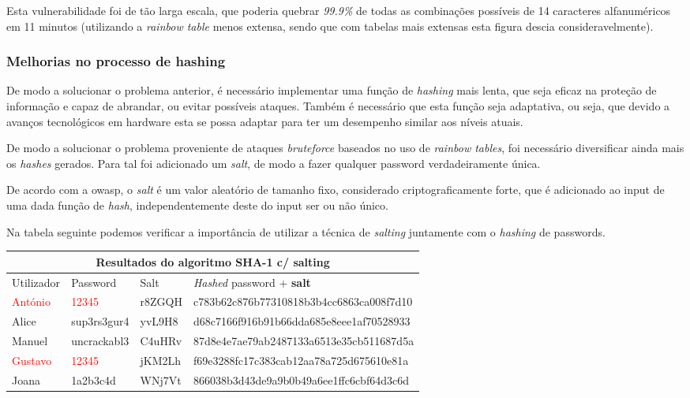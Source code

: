 Esta vulnerabilidade foi de tão larga escala, que poderia quebrar \emph{99.9\%} de todas as combinações possíveis de 14 caracteres alfanuméricos em 11 minutos (utilizando a \emph{rainbow table} menos extensa, sendo que com tabelas mais extensas esta figura descia consideravelmente).


\subsubsection{Melhorias no processo de hashing}

De modo a solucionar o problema anterior, é necessário implementar uma função de \emph{hashing} mais lenta, que seja eficaz na proteção de informação e capaz de abrandar, ou evitar possíveis ataques. Também é necessário que esta função seja adaptativa, ou seja, que devido a avanços tecnológicos em hardware esta se possa adaptar para ter um desempenho similar aos níveis atuais.

De modo a solucionar o problema proveniente de ataques \emph{bruteforce} baseados no uso de \emph{rainbow tables}, foi necessário diversificar ainda mais os \emph{hashes} gerados. Para tal foi adicionado um \emph{salt}\cite{sriramya2015providing}, de modo a fazer qualquer password verdadeiramente única.

De acordo com a \gls{owasp}, o \emph{salt} é um valor aleatório de tamanho fixo, considerado criptograficamente forte, que é adicionado ao input de uma dada função de \emph{hash}, independentemente deste do input ser ou não único.

Na tabela seguinte podemos verificar a importância de utilizar a técnica de \emph{salting} juntamente com o \emph{hashing} de passwords.

\begin{center}
    \begin{tabular}{ |p{1.7cm}|p{2cm}|p{1.5cm}|p{8cm}|  }
        \hline
        \multicolumn{4}{|c|}{Resultados do algoritmo SHA-1 c/ salting} \\
        \hline
        Utilizador & Password & Salt &\emph{Hashed} password + \textbf{salt}\\
        \hline 
        \textcolor{red}{António} & \textcolor{red}{12345} & r8ZGQH & c783b62c876b77310818b3b4cc6863ca008f7d10\\
        Alice & sup3rs3gur4 & yvL9H8 & d68c7166f916b91b66dda685e8eee1af70528933\\
        Manuel & uncrackabl3 & C4uHRv & 87d8e4e7ae79ab2487133a6513e35cb511687d5a\\
        \textcolor{red}{Gustavo} & \textcolor{red}{12345} & jKM2Lh & f69e3288fc17c383cab12aa78a725d675610e81a\\
        Joana & 1a2b3c4d & WNj7Vt & 866038b3d43de9a9b0b49a6ee1ffc6cbf64d3c6d\\
        \hline
    \end{tabular}
\label{tab:sha1_salt} 
\end{center}

